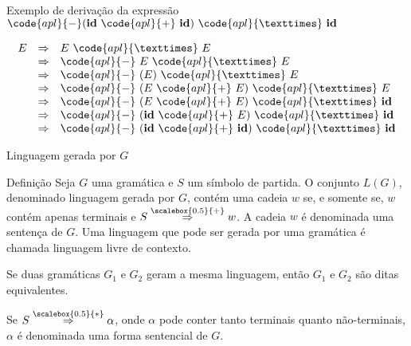 \begin{frame}[fragile]{Exemplo de derivação da expressão $\code{apl}{-}(\textbf{id}\ \code{apl}{+}\ \textbf{id})\ \code{apl}{×}\ \textbf{id}$}

\[
    \begin{array}{rcl}
        E & \Rightarrow & E\ \code{apl}{×}\ E \\
          & \Rightarrow & \code{apl}{-}\ E\ \code{apl}{×}\ E\\
          & \Rightarrow & \code{apl}{-}\ (E)\ \code{apl}{×}\ E\\
          & \Rightarrow & \code{apl}{-}\ (E\ \code{apl}{+}\ E)\ \code{apl}{×}\ E\\
          & \Rightarrow & \code{apl}{-}\ (E\ \code{apl}{+}\ E)\ \code{apl}{×}\ \textbf{id}\\
          & \Rightarrow & \code{apl}{-}\ (\textbf{id}\ \code{apl}{+}\ E)\ \code{apl}{×}\ \textbf{id}\\
          & \Rightarrow & \code{apl}{-}\ (\textbf{id}\ \code{apl}{+}\ \textbf{id})\ \code{apl}{×}\ \textbf{id}
    \end{array}
\]

\end{frame}

\begin{frame}[fragile]{Linguagem gerada por $G$}

    \begin{block}{Definição}
        Seja $G$ uma gramática e $S$ um símbolo de partida. O conjunto $L(G)$, denominado linguagem gerada por $G$, contém uma cadeia $w$ se, e somente se,
            $w$ contém apenas terminais e 
            $S \overset{\scalebox{0.5}{+}}{\Rightarrow} w$. A cadeia $w$ é denominada uma sentença de $G$. Uma linguagem que pode ser gerada por uma gramática é
            chamada linguagem livre de contexto.

            \vspace{0.1in}

            Se duas gramáticas $G_1$ e $G_2$ geram a mesma linguagem, então $G_1$ e $G_2$ são ditas equivalentes.

            \vspace{0.1in}

            Se $S \overset{\scalebox{0.5}{*}}{\Rightarrow} \alpha$, onde $\alpha$ pode conter tanto terminais quanto não-terminais, $\alpha$ é denominada uma forma sentencial de $G$.
    \end{block}

\end{frame}

